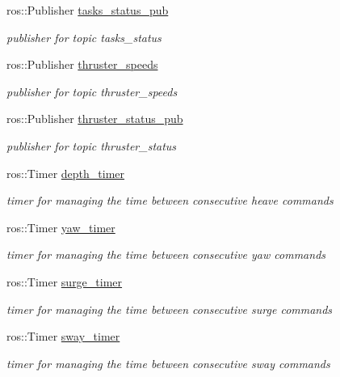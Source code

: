 \begin{DoxyCompactItemize}
ros\+::\+Publisher \hyperlink{classControl_a3b6b1a9000c0a6eb5037b43fac65f79a}{tasks\+\_\+status\+\_\+pub}
\begin{DoxyCompactList}\small\item\em publisher for topic tasks\+\_\+status \end{DoxyCompactList}\item 
ros\+::\+Publisher \hyperlink{classControl_a723ac5a2c2928cebde4b372f9feb4b0f}{thruster\+\_\+speeds}
\begin{DoxyCompactList}\small\item\em publisher for topic thruster\+\_\+speeds \end{DoxyCompactList}\item 
ros\+::\+Publisher \hyperlink{classControl_a914384fbf8c6a3e58a485fc91c44d374}{thruster\+\_\+status\+\_\+pub}
\begin{DoxyCompactList}\small\item\em publisher for topic thruster\+\_\+status \end{DoxyCompactList}\item 
ros\+::\+Timer \hyperlink{classControl_a2fb8968d2bdfa14be8d7c6a1931ac3ad}{depth\+\_\+timer}
\begin{DoxyCompactList}\small\item\em timer for managing the time between consecutive heave commands \end{DoxyCompactList}\item 
ros\+::\+Timer \hyperlink{classControl_a774bb8a7f0b6355dd487eac011fc54e2}{yaw\+\_\+timer}
\begin{DoxyCompactList}\small\item\em timer for managing the time between consecutive yaw commands \end{DoxyCompactList}\item 
ros\+::\+Timer \hyperlink{classControl_a01b569ce4cb201b75b1304800c5957f1}{surge\+\_\+timer}
\begin{DoxyCompactList}\small\item\em timer for managing the time between consecutive surge commands \end{DoxyCompactList}\item 
ros\+::\+Timer \hyperlink{classControl_a5b838b01bae62bcd23ddb8089a73b217}{sway\+\_\+timer}
\begin{DoxyCompactList}\small\item\em timer for managing the time between consecutive sway commands \end{DoxyCompactList}\item 

\end{DoxyCompactItemize}
